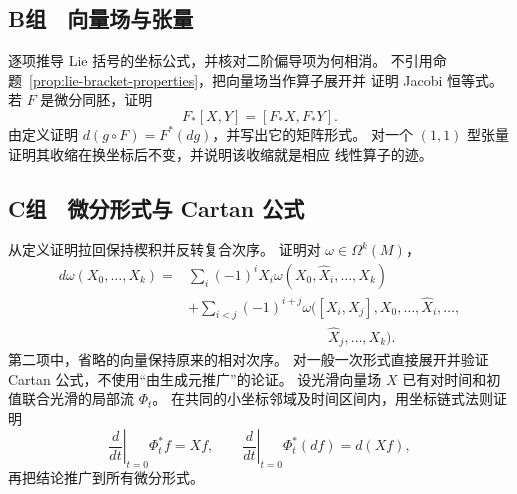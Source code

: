 \subsection*{B组　向量场与张量}
\begin{enumerate}[label=\textbf{\thechapter.\arabic*.},resume]
 逐项推导 Lie 括号的坐标公式，并核对二阶偏导项为何相消。
 不引用命题~\ref{prop:lie-bracket-properties}，把向量场当作算子展开并
 证明 Jacobi 恒等式。
 若 \(F\) 是微分同胚，证明
 \[
  F_*[X,Y]=[F_*X,F_*Y].
 \]
 由定义证明 \(d(g\circ F)=F^*(dg)\)，并写出它的矩阵形式。
 对一个 \((1,1)\) 型张量证明其收缩在换坐标后不变，并说明该收缩就是相应
 线性算子的迹。
\end{enumerate}

\subsection*{C组　微分形式与 Cartan 公式}
\begin{enumerate}[label=\textbf{\thechapter.\arabic*.},resume]
 从定义证明拉回保持楔积并反转复合次序。
 证明对 \(\omega\in\Omega^k(M)\)，
 \[
 \begin{aligned}
 d\omega(X_0,\ldots,X_k)
 ={}&\sum_i(-1)^iX_i
 \omega(X_0,\widehat X_i,\ldots,X_k)\\
 &+\sum_{i<j}(-1)^{i+j}
 \omega\bigl([X_i,X_j],X_0,\ldots,\widehat X_i,\ldots,\\
 &\hspace{10em}\widehat X_j,\ldots,X_k\bigr).
 \end{aligned}
 \]
 第二项中，省略的向量保持原来的相对次序。
 对一般一次形式直接展开并验证 Cartan 公式，不使用“由生成元推广”的论证。
 设光滑向量场 \(X\) 已有对时间和初值联合光滑的局部流 \(\Phi_t\)。
 在共同的小坐标邻域及时间区间内，用坐标链式法则证明
 \[
  \left.\frac{d}{dt}\right|_{t=0}\Phi_t^*f=Xf,\qquad
  \left.\frac{d}{dt}\right|_{t=0}\Phi_t^*(df)=d(Xf),
 \]
 再把结论推广到所有微分形式。
\end{enumerate}
